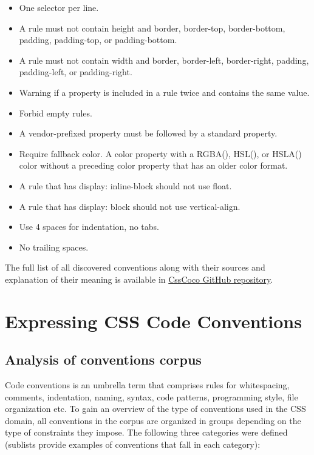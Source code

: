\documentclass[parskip=full]{uvamscse}
\begin{document}
\begin{itemize}
\item One selector per line.
\item A rule must not contain height and border, border-top, border-bottom, padding, padding-top, or padding-bottom.
\item A rule must not contain width and border, border-left, border-right, padding, padding-left, or padding-right.
\item Warning if a property is included in a rule twice and contains the same value.
\item Forbid empty rules.
\item A vendor-prefixed property must be followed by a standard property.
\item Require fallback color. A color property with a RGBA(), HSL(), or HSLA() color without a preceding color property that has an older color format.
\item A rule that has display: inline-block should not use float.
\item A rule that has display: block should not use vertical-align.
\item Use 4 spaces for indentation, no tabs.
\item No trailing spaces.
\end{itemize}

The full list of all discovered conventions along with their sources and explanation of their meaning is available in \href{https://github.com/boryanagoncharenko/CssCoco/blob/master/analysis.md}{CssCoco GitHub repository}.


\chapter{Expressing CSS Code Conventions}
\label{sec:expressing}

\section{Analysis of conventions corpus}

Code conventions is an umbrella term that comprises rules for whitespacing, comments, indentation,
naming, syntax, code patterns, programming style, file organization etc. To gain an overview of the
type of conventions used in the CSS domain, all conventions in the corpus are organized in groups
depending on the type of constraints they impose. The following three categories were defined
(sublists provide examples of conventions that fall in each category):
\end{document}

